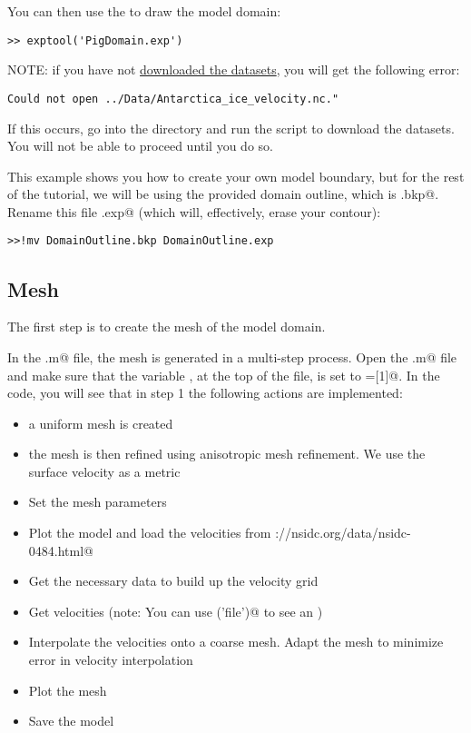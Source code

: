 You can then use the \verb@exptool@ to draw the model domain:
\begin{verbatim}>> exptool('PigDomain.exp')\end{verbatim}

NOTE: if you have not \href{https://issm.jpl.nasa.gov/documentation/tutorials/datasets/}{downloaded the datasets}, you will get the following error:
\begin{verbatim}Could not open ../Data/Antarctica_ice_velocity.nc."\end{verbatim}
If this occurs, go into the \verb@Data@ directory and run the script to download the datasets. You
will not be able to proceed until you do so.

This example shows you how to create your own model boundary, but for the rest of the tutorial, we
will be using the provided domain outline, which is \verb@ModelDomain.bkp@. Rename this file \verb@ModelDomain.exp@ (which will, effectively, erase your contour):
\begin{verbatim}>>!mv DomainOutline.bkp DomainOutline.exp\end{verbatim}
\subsection{Mesh}%
The first step is to create the mesh of the model domain.

In the \verb@runme.m@ file, the mesh is generated in a multi-step process. Open the \verb@runme.m@ file and make sure that the variable \verb@steps@, at the top of the file, is set to \verb@steps=[1]@. In the code, you will see that in step 1 the following actions are implemented:

\begin{itemize}
	\item a uniform mesh is created
	\item the mesh is then refined using anisotropic mesh refinement. We use the surface velocity as a metric
	\item Set the mesh parameters
	\item Plot the model and load the velocities from \verb@http://nsidc.org/data/nsidc-0484.html@
	\item Get the necessary data to build up the velocity grid
	\item Get velocities (note: You can use \verb@ncdisp('file')@ to see an \verb@ncdump@)
	\item Interpolate the velocities onto a coarse mesh. Adapt the mesh to minimize error in velocity interpolation
	\item Plot the mesh
	\item Save the model
\end{itemize}

